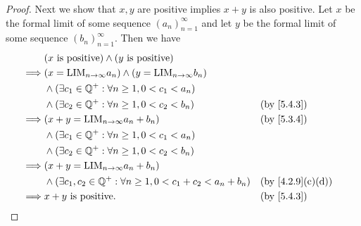 \begin{proof}
  Next we show that \(x, y\) are positive implies \(x + y\) is also positive.
  Let \(x\) be the formal limit of some sequence \((a_n)_{n = 1}^{\infty}\) and let \(y\) be the formal limit of some sequence \((b_n)_{n = 1}^{\infty}\).
  Then we have
  \begin{align*}
             & (x \text{ is positive}) \land (y \text{ is positive})                                                               \\
    \implies & (x = \text{LIM}_{n \to \infty} a_n) \land (y = \text{LIM}_{n \to \infty} b_n)                                       \\
             & \land (\exists c_1 \in \Q^+ : \forall n \geq 1, 0 < c_1 < a_n)                                                      \\
             & \land (\exists c_2 \in \Q^+ : \forall n \geq 1, 0 < c_2 < b_n)                  &  & \by{5.4.3}                     \\
    \implies & (x + y = \text{LIM}_{n \to \infty} a_n + b_n)                                   &  & \by{5.3.4}                     \\
             & \land (\exists c_1 \in \Q^+ : \forall n \geq 1, 0 < c_1 < a_n)                                                      \\
             & \land (\exists c_2 \in \Q^+ : \forall n \geq 1, 0 < c_2 < b_n)                                                      \\
    \implies & (x + y = \text{LIM}_{n \to \infty} a_n + b_n)                                                                       \\
             & \land (\exists c_1, c_2 \in \Q^+ : \forall n \geq 1, 0 < c_1 + c_2 < a_n + b_n) &  & \text{(by \cref{4.2.9}(c)(d))} \\
    \implies & x + y \text{ is positive}.                                                      &  & \by{5.4.3}
  \end{align*}


\end{proof}
